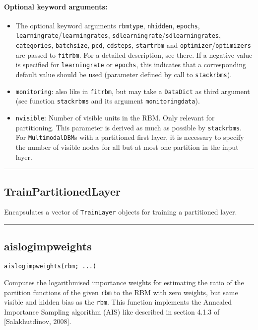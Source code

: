 \paragraph*{Optional keyword arguments:}
\begin{itemize}
\item The optional keyword arguments \texttt{rbmtype}, \texttt{nhidden}, \texttt{epochs}, \texttt{learningrate}\slash \texttt{learningrates}, \texttt{sdlearningrate}\slash \texttt{sdlearningrates}, \texttt{categories}, \texttt{batchsize}, \texttt{pcd}, \texttt{cdsteps}, \texttt{startrbm} and \texttt{optimizer}\slash \texttt{optimizers} are passed to \texttt{fitrbm}. For a detailed description, see there. If a negative value is specified for \texttt{learningrate} or \texttt{epochs}, this indicates that a corresponding default value should be used (parameter defined by call to \texttt{stackrbms}).


\item \texttt{monitoring}: also like in \texttt{fitrbm}, but may take a \texttt{DataDict} as third argument  (see function \texttt{stackrbms} and its argument \texttt{monitoringdata}).


\item \texttt{nvisible}: Number of visible units in the RBM. Only relevant for partitioning.  This parameter is derived as much as possible by \texttt{stackrbms}.  For \texttt{MultimodalDBM}s with a partitioned first layer, it is necessary to specify  the number of visible nodes for all but at most one partition in the input layer.

\end{itemize}
\noindent\rule{\textwidth}{1pt}
\subsection*{TrainPartitionedLayer}  \label{bms_TrainPartitionedLayer}
Encapsulates a vector of \texttt{TrainLayer} objects for training a partitioned layer.

\noindent\rule{\textwidth}{1pt}
\subsection*{aislogimpweights}  \label{bms_aislogimpweights}
\begin{verbatim}
aislogimpweights(rbm; ...)
\end{verbatim}
Computes the logarithmised importance weights for estimating the ratio of the partition functions of the given \texttt{rbm} to the RBM with zero weights, but same visible and hidden bias as the \texttt{rbm}. This function implements the Annealed Importance Sampling algorithm (AIS) like described in section 4.1.3 of [Salakhutdinov, 2008].

